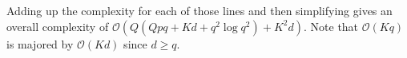 Adding up the complexity for each of those lines and then simplifying gives an overall complexity of $\mathcal{O}(Q(Qpq + Kd + q^2\log q^2) + K^2d)$. Note that $\mathcal{O}(Kq)$ is majored by $\mathcal{O}(Kd)$ since $d \geq q$.

%
%
%
%
%
%
%


%
%
%

